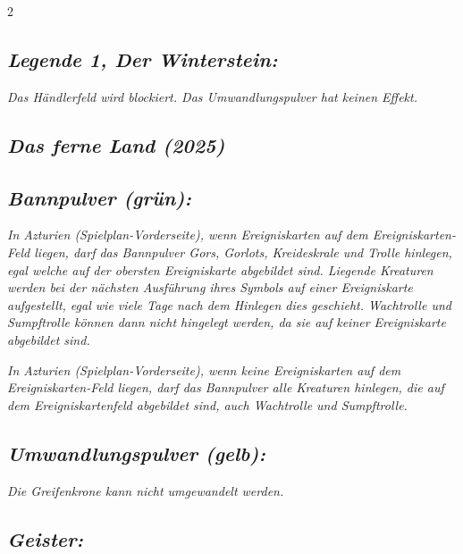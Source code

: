 \documentclass[10pt, a4paper, oneside]{book}
\newcommand{\fan}[1]{\textit{#1}}
\begin{document}
\begin{multicols*}{2}
\begin{bgcolor}
\subsection{\fan{Legende 1, Der Winterstein:}}


\fan{Das Händlerfeld wird blockiert. Das Umwandlungspulver hat keinen Effekt.}


\end{bgcolor}


\columnbreak



\begin{bgcolor}
\section{\fan{Das ferne Land (2025)}}


\subsection{\fan{Bannpulver (grün):}}

\fan{In Azturien (Spielplan-Vorderseite), wenn Ereigniskarten auf dem Ereigniskarten-Feld liegen, darf das Bannpulver Gors, Gorlots, Kreideskrale und Trolle hinlegen, egal welche auf der obersten Ereigniskarte abgebildet sind. Liegende Kreaturen werden bei der nächsten Ausführung ihres Symbols auf einer Ereigniskarte aufgestellt, egal wie viele Tage nach dem Hinlegen dies geschieht. Wachtrolle und Sumpftrolle können dann nicht hingelegt werden, da sie auf keiner Ereigniskarte abgebildet sind.}

\fan{In Azturien (Spielplan-Vorderseite), wenn keine Ereigniskarten auf dem Ereigniskarten-Feld liegen, darf das Bannpulver alle Kreaturen hinlegen, die auf dem Ereigniskartenfeld abgebildet sind, auch Wachtrolle und Sumpftrolle.}





\subsection{\fan{Umwandlungspulver (gelb):}}

\fan{Die Greifenkrone kann nicht umgewandelt werden.}



\subsection{\fan{Geister:}}


\end{bgcolor}
\end{multicols*}
\end{document}

